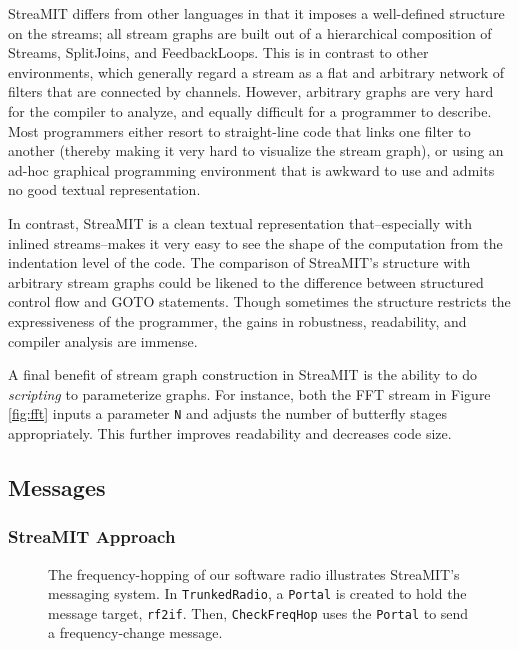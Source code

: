 StreaMIT differs from other languages in that it imposes a
well-defined structure on the streams; all stream graphs are built out
of a hierarchical composition of Streams, SplitJoins, and
FeedbackLoops.  This is in contrast to other environments, which
generally regard a stream as a flat and arbitrary network of filters
that are connected by channels.  However, arbitrary graphs are very
hard for the compiler to analyze, and equally difficult for a
programmer to describe.  Most programmers either resort to
straight-line code that links one filter to another (thereby making it
very hard to visualize the stream graph), or using an ad-hoc graphical
programming environment that is awkward to use and admits no good
textual representation.

In contrast, StreaMIT is a clean textual representation
that--especially with inlined streams--makes it very easy to see the
shape of the computation from the indentation level of the code.  The
comparison of StreaMIT's structure with arbitrary stream graphs could
be likened to the difference between structured control flow and GOTO
statements.  Though sometimes the structure restricts the
expressiveness of the programmer, the gains in robustness,
readability, and compiler analysis are immense.

A final benefit of stream graph construction in StreaMIT is the
ability to do {\it scripting} to parameterize graphs.  For instance,
both the FFT stream in Figure \ref{fig:fft} inputs a parameter {\tt N}
and adjusts the number of butterfly stages appropriately.  This
further improves readability and decreases code size.

\subsection{Messages}

\subsubsection{StreaMIT Approach}

\begin{figure}
\caption{The frequency-hopping of our software radio illustrates StreaMIT's messaging system.  In {\tt TrunkedRadio}, a {\tt Portal} is created to hold the message target, {\tt rf2if}.  Then, {\tt CheckFreqHop} uses the {\tt Portal} to send a frequency-change message.}
\label{fig:portal-code}
\end{figure}


